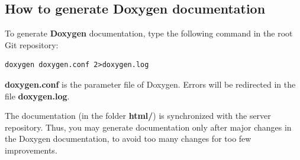 \documentclass[english,a4paper,twoside]{article}
\begin{document}
\subsection{How to generate Doxygen documentation}
To generate \textbf{Doxygen} documentation, type the following command in the root Git repository:
\begin{verbatim}
doxygen doxygen.conf 2>doxygen.log
\end{verbatim}

\textbf{doxygen.conf} is the parameter file of Doxygen. Errors will be redirected in the file \textbf{doxygen.log}.

\begin{attention}
The documentation (in the folder \textbf{html/}) is synchronized with the server repository. Thus, you may generate documentation only after major changes in the Doxygen documentation, to avoid too many changes for too few improvements.
\end{attention}



\printindex
\end{document}
